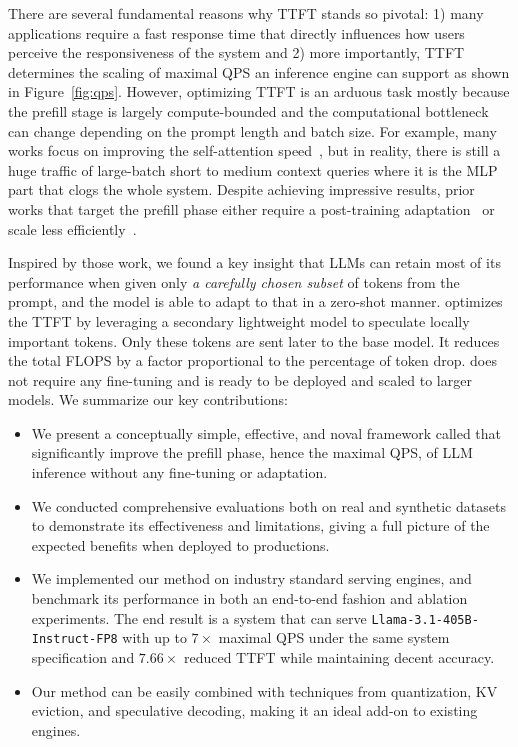 There are several fundamental reasons why TTFT stands so pivotal: 1) many applications require a fast response time that directly influences how users perceive the responsiveness of the system and 2) more importantly, TTFT determines the scaling of maximal QPS an inference engine can support as shown in Figure~\ref{fig:qps}. 
However, optimizing TTFT is an arduous task mostly because the prefill stage is largely compute-bounded and the computational bottleneck can change depending on the prompt length and batch size. For example, many works focus on improving the self-attention speed~\cite{dao2022flashattentionfastmemoryefficientexact, jiang2024minference10acceleratingprefilling}, but in reality, there is still a huge traffic of large-batch short to medium context queries where it is the MLP part that clogs the whole system. 
Despite achieving impressive results, prior works that target the prefill phase either require a post-training adaptation~\cite{qiao2024swiftkvfastprefilloptimizedinference,horton2024kvpredictionimprovedtime} or scale less efficiently~\cite{shi2024discoveringgemsearlylayers}. 

Inspired by those work, we found a key insight that LLMs can retain most of its performance when given only \textit{a carefully chosen subset} of tokens from the prompt, and the model is able to adapt to that in a zero-shot manner. \ours{} optimizes the TTFT by leveraging a secondary lightweight model to speculate locally important tokens. Only these tokens are sent later to the base model. It reduces the total FLOPS by a factor proportional to the percentage of token drop. \ours{} does not require any fine-tuning and is ready to be deployed and scaled to larger models. We summarize our key contributions: 

\begin{itemize}
    \item We present a conceptually simple, effective, and noval framework called \ours{} that significantly improve the prefill phase, hence the maximal QPS, of LLM inference without any fine-tuning or adaptation. 
    \item We conducted comprehensive evaluations both on real and synthetic datasets to demonstrate its effectiveness and limitations, giving a full picture of the expected benefits when deployed to productions. 
    \item We implemented our method on industry standard serving engines, and benchmark its performance in both an end-to-end fashion and ablation experiments. The end result is a system that can serve \texttt{Llama-3.1-405B-Instruct-FP8} with up to $7\times$ maximal QPS under the same system specification and $7.66\times$ reduced TTFT while maintaining decent accuracy. 
    \item Our method can be easily combined with techniques from quantization, KV eviction, and speculative decoding, making it an ideal add-on to existing engines. 
\end{itemize}